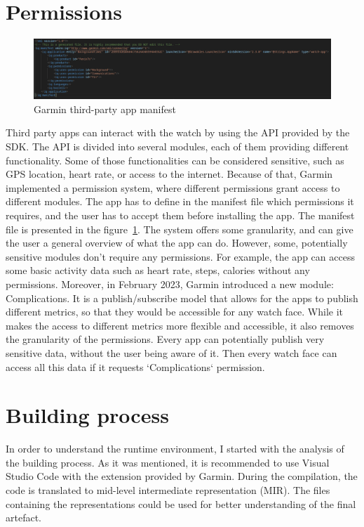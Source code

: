 \section{Permissions}
\begin{figure}[h]
    \centering
    \includegraphics[width=1\linewidth]{../../images/garmin-app-manifest}
    \caption{Garmin third-party app manifest}
    \label{fig:garmin-app-manifest}
\end{figure}
Third party apps can interact with the watch by using the API provided by the SDK.
The API is divided into several modules, each of them providing different functionality.
Some of those functionalities can be considered sensitive, such as GPS location, heart rate, or access to the internet.
Because of that, Garmin implemented a permission system, where different permissions grant access to different modules.
The app has to define in the manifest file which permissions it requires, and the user has to accept them before installing the app.
The manifest file is presented in the figure~\ref{fig:garmin-app-manifest}.
The system offers some granularity, and can give the user a general overview of what the app can do.
However, some, potentially sensitive modules don't require any permissions.
For example, the app can access some basic activity data such as heart rate, steps, calories without any permissions.
Moreover, in February 2023, Garmin introduced a new module: Complications.
It is a publish/subscribe model that allows for the apps to publish different metrics, so that they would be accessible for any watch face.
While it makes the access to different metrics more flexible and accessible, it also removes the granularity of the permissions.
Every app can potentially publish very sensitive data, without the user being aware of it.
Then every watch face can access all this data if it requests `Complications` permission.

\section{Building process}
In order to understand the runtime environment, I started with the analysis of the building process.
As it was mentioned, it is recommended to use Visual Studio Code with the extension provided by Garmin.
During the compilation, the code is translated to mid-level intermediate representation (MIR).
The files containing the representations could be used for better understanding of the final artefact.

